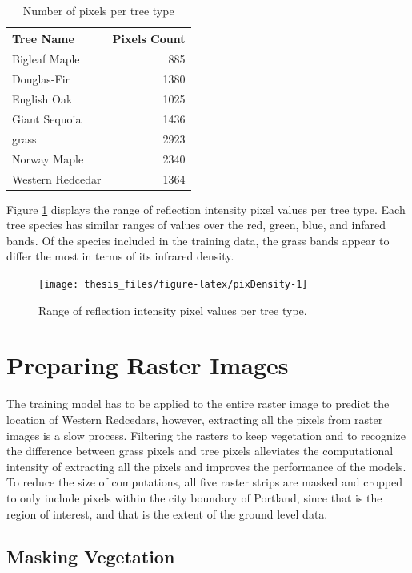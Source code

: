 \documentclass[12pt,twoside]{reedthesis}
\begin{document}
\begin{table}

\caption{\label{tab:pixelCounts}Number of pixels per tree type}
\centering
\begin{tabular}[t]{l|r}
\hline
Tree Name & Pixels Count\\
\hline
Bigleaf Maple & 885\\
\hline
Douglas-Fir & 1380\\
\hline
English Oak & 1025\\
\hline
Giant Sequoia & 1436\\
\hline
grass & 2923\\
\hline
Norway Maple & 2340\\
\hline
Western Redcedar & 1364\\
\hline
\end{tabular}
\end{table}
Figure \ref{fig:pixDensity} displays the range of reflection intensity pixel values per tree type. Each tree species has similar ranges of values over the red, green, blue, and infared bands. Of the species included in the training data, the grass bands appear to differ the most in terms of its infrared density.
\begin{figure}

{\centering \texttt{[image: thesis\_files/figure-latex/pixDensity-1]} 

}

\caption{Range of reflection intensity pixel values per tree type.}\label{fig:pixDensity}
\end{figure}
\hypertarget{preparing-raster-images}{%
\chapter{Preparing Raster Images}\label{preparing-raster-images}}

The training model has to be applied to the entire raster image to predict the location of Western Redcedars, however, extracting all the pixels from raster images is a slow process. Filtering the rasters to keep vegetation and to recognize the difference between grass pixels and tree pixels alleviates the computational intensity of extracting all the pixels and improves the performance of the models. To reduce the size of computations, all five raster strips are masked and cropped to only include pixels within the city boundary of Portland, since that is the region of interest, and that is the extent of the ground level data.

\hypertarget{masking-vegetation}{%
\section{Masking Vegetation}\label{masking-vegetation}}
\end{document}
